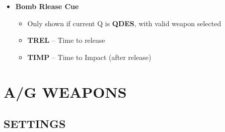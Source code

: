 \documentclass[fontInter]{TechCheck}
\begin{document}
\begin{longtableitemize}
{\begin{tableminipage}
			\begin{itemize}
				\item \textbf{Bomb Rlease Cue}
				\begin{itemize}
					\item Only shown if current Q is \textbf{QDES}, with valid weapon selected
					\item \textbf{TREL} -- Time to release
					\item \textbf{TIMP} -- Time to Impact (after release)
				\end{itemize}
			\end{itemize}
		\end{tableminipage}}
	\end{longtableitemize}

	\cleardoublepage

	\chapter{A/G WEAPONS}
	\minitoc
	\cleardoublepage

	\section{SETTINGS}
\end{document}
